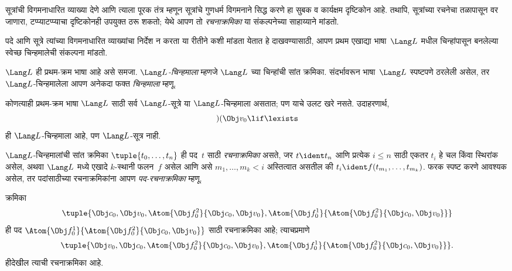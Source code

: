 सूत्रांची विगमनाधारित व्याख्या देणे आणि त्याला पूरक तंत्र म्हणून
सूत्रांचे गुणधर्म विगमनाने सिद्ध करणे हा सुबक व कार्यक्षम
दृष्टिकोन आहे. तथापि, सूत्रांच्या रचनेचा तळापासून वर जाणारा,
टप्प्याटप्प्याचा दृष्टिकोनही उपयुक्त ठरू शकतो; येथे आपण तो
\emph{रचनाक्रमिका} या संकल्पनेच्या साहाय्याने मांडतो.

पदे आणि सूत्रे त्यांच्या विगमनाधारित व्याख्यांचा निर्देश न करता
या रीतीने कशी मांडता येतात हे दाखवण्यासाठी, आपण प्रथम एखाद्या
भाषा~$\Lang L$ मधील चिन्हांपासून बनलेल्या स्वेच्छ चिन्हमालेची संकल्पना
मांडतो.

\begin{defn}[चिन्हमाला]
\label{fol:syn:fseq:defn:string}
$\Lang L$ ही प्रथम-क्रम भाषा आहे असे समजा. \emph{$\Lang L$-चिन्हमाला}
म्हणजे $\Lang L$ च्या चिन्हांची सांत क्रमिका. संदर्भावरून भाषा~$\Lang L$
स्पष्टपणे ठरलेली असेल, तर $\Lang L$-चिन्हमालेला आपण अनेकदा फक्त
\emph{चिन्हमाला} म्हणू.
\end{defn}

\begin{ex}
कोणत्याही प्रथम-क्रम भाषा $\Lang L$ साठी सर्व $\Lang L$-सूत्रे
या $\Lang L$-चिन्हमाला असतात; पण याचे उलट खरे नसते. उदाहरणार्थ,
\[)(\Obj v_0\lif\lexists\] ही $\Lang L$-चिन्हमाला आहे, पण
$\Lang L$-सूत्र नाही.
\end{ex}

\begin{defn}[पदांसाठी रचनाक्रमिका]
\label{fol:syn:fseq:defn:fseq-trm}
$\Lang L$-चिन्हमालांची सांत क्रमिका $\tuple{t_0,\dotsc,t_n}$ ही पद~$t$
साठी \emph{रचनाक्रमिका} असते, जर $t \ident t_n$ आणि प्रत्येक $i \leq n$
साठी एकतर $t_i$ हे चल किंवा स्थिरांक असेल, अथवा $\Lang
L$ मध्ये एखादे $k$-स्थानी फलन~$f$ असेल आणि असे
$m_1,\dotsc,m_k < i$ अस्तित्वात असतील की
$t_i \ident f(t_{m_1},\dotsc,t_{m_k})$. फरक स्पष्ट करणे आवश्यक असेल,
तर पदांसाठीच्या रचनाक्रमिकांना आपण \emph{पद-रचनाक्रमिका} म्हणू.

\end{defn}

\begin{ex}
क्रमिका
\[    \tuple{\Obj c_0, \Obj v_0, \Atom{\Obj f^2_0}{\Obj c_0, \Obj v_0}, \Atom{\Obj f^1_0}{\Atom{\Obj f^2_0}{\Obj c_0, \Obj v_0}}}
\]
ही पद $\Atom{\Obj f^1_0}{\Atom{\Obj
f^2_0}{\Obj c_0, \Obj v_0}}$ साठी रचनाक्रमिका आहे; त्याचप्रमाणे
\[    \tuple{\Obj v_0, \Obj c_0, \Atom{\Obj f^2_0}{\Obj c_0, \Obj v_0}, \Atom{\Obj f^1_0}{\Atom{\Obj f^2_0}{\Obj c_0, \Obj v_0}}}.
\]
हीदेखील त्याची रचनाक्रमिका आहे.
\end{ex}


